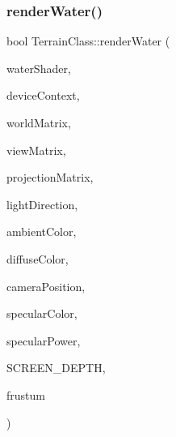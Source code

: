 \subsubsection{\texorpdfstring{render\+Water()}{renderWater()}}
{\footnotesize\ttfamily bool Terrain\+Class\+::render\+Water (\begin{DoxyParamCaption}\item[{\hyperlink{class_water_shader_class}{Water\+Shader\+Class} $\ast$}]{water\+Shader,  }\item[{I\+D3\+D11\+Device\+Context $\ast$}]{device\+Context,  }\item[{D3\+D\+X\+M\+A\+T\+R\+IX}]{world\+Matrix,  }\item[{D3\+D\+X\+M\+A\+T\+R\+IX}]{view\+Matrix,  }\item[{D3\+D\+X\+M\+A\+T\+R\+IX}]{projection\+Matrix,  }\item[{D3\+D\+X\+V\+E\+C\+T\+O\+R3}]{light\+Direction,  }\item[{D3\+D\+X\+V\+E\+C\+T\+O\+R4}]{ambient\+Color,  }\item[{D3\+D\+X\+V\+E\+C\+T\+O\+R4}]{diffuse\+Color,  }\item[{D3\+D\+X\+V\+E\+C\+T\+O\+R3}]{camera\+Position,  }\item[{D3\+D\+X\+V\+E\+C\+T\+O\+R4}]{specular\+Color,  }\item[{float}]{specular\+Power,  }\item[{float}]{S\+C\+R\+E\+E\+N\+\_\+\+D\+E\+P\+TH,  }\item[{\hyperlink{class_frustum_class}{Frustum\+Class} $\ast$}]{frustum }\end{DoxyParamCaption})\hspace{0.3cm}{\ttfamily [private]}}

